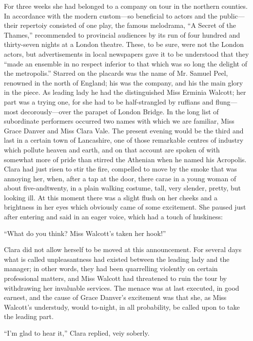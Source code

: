 For three weeks she had belonged to a company on tour in the northern
counties. In accordance with the modern custom---so beneficial to actors
and the public---their repertoiy consisted of one play, the famous
melodrama, ``A Secret of the Thames,'' recommended to provincial
audiences by its run of four hundred and thirty-seven nights at a London
theatre. These, to be sure, were {}not the London actors, but
advertisements in local newspapers gave it to be understood that they
``made an ensemble in no respect inferior to that which was so long the
delight of the metropolis.'' Starred on the placards was the name of Mr.
Samuel Peel, renowned in the north of England; his was the company, and
his the main glory in the piece. As leading lady he had the
distinguished Miss Erminia Walcott; her part was a trying one, for she
had to be half-strangled by ruffians and flung---most decorously---over
the parapet of London Bridge. In the long list of subordinate performers
occurred two names with which we are familiar, Miss Grace Danver and
Miss Clara Vale. The present evening would be the third and last in a
certain town of Lancashire, one of those remarkable centres of industry
which pollute heaven and earth, and on that account are spoken of with
somewhat more of pride than stirred the Athenian when he named his
Acropolis. Clara had just risen to stir the fire, compelled to move by
the smoke that was {}annoying her, when, after a tap at the door, there
carae in a young woman of about five-andtwenty, in a plain walking
costume, tall, very slender, pretty, but looking ill. At this moment
there was a slight flush on her cheeks and a brightness in her eyes
which obviously came of some excitement. She paused just after entering
and said in an eager voice, which had a touch of huskiness:

``What do you think? Miss Walcott's taken her hook!''

Clara did not allow herself to be moved at this announcement. For
several days what is called unpleasantness had existed between the
leading lady and the manager; in other words, they had been quarrelling
violently on certain professional matters, and Miss Walcott had
threatened to ruin the tour by withdrawing her invaluable services. The
menace was at last executed, in good earnest, and the cause of Grace
Danver's excitement was that she, as Miss Walcott's understudy, would
to-night, in all probability, be called upon to take the leading part.

{}``I'm glad to hear it,'' Clara replied, veiy soberly.

